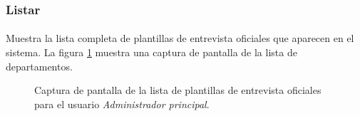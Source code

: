 \subsubsection{Listar}

  \paragraph{}Muestra la lista completa de plantillas de entrevista oficiales
  que aparecen en el sistema. La figura
  \ref{capturaPantallaListaPlantillasOficialesAdminPrincipal} muestra una
  captura de pantalla de la lista de departamentos.

  \begin{figure}[!ht]
    \begin{center}
      \caption{Captura de pantalla de la lista de plantillas de entrevista oficiales para el usuario \textit{Administrador principal}.}
      \label{capturaPantallaListaPlantillasOficialesAdminPrincipal}
    \end{center}
  \end{figure}
